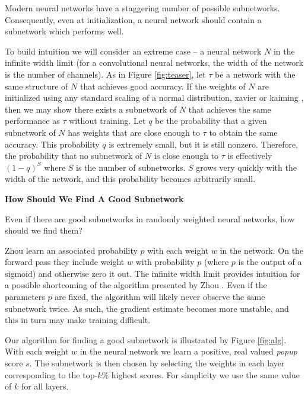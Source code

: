 \documentclass[10pt,twocolumn,letterpaper]{article}
\begin{document}
Modern neural networks have a staggering number of possible subnetworks. Consequently, even at initialization, a neural network should contain a subnetwork which performs well. 

To build intuition we will consider an extreme case -- a neural network $N$ in the infinite width limit (for a convolutional neural networks, the width of the network is the number of channels). As in Figure \ref{fig:teaser}, let $\tau$ be a network with the same structure of $N$ that achieves good accuracy. If the weights of $N$ are initialized using any standard scaling of a normal distribution, \eg xavier \cite{glorot} or kaiming \cite{kaiming-init}, then we may show there exists a subnetwork of $N$ that achieves the same performance as $\tau$ without training. Let $q$ be the probability that a given subnetwork of $N$ has weights that are close enough to $\tau$ to obtain the same accuracy. This probability $q$ is extremely small, but it is still nonzero. Therefore, the probability that no subnetwork of $N$ is close enough to $\tau$ is effectively $(1-q)^S$ where $S$ is the number of subnetworks. $S$ grows very quickly with the width of the network, and this probability becomes arbitrarily small.

\noindent \textbf{How Should We Find A Good Subnetwork}


Even if there are good subnetworks in randomly weighted neural networks, how should we find them? 


Zhou \etal learn an associated probability $p$ with each weight $w$ in the network. On the forward pass they include weight $w$ with probability $p$ (where $p$ is the output of a sigmoid) and otherwise zero it out. The infinite width limit provides intuition for a possible shortcoming of the algorithm presented by Zhou \etal \cite{supermask}. Even if the parameters $p$ are fixed, the algorithm will likely never observe the same subnetwork twice. As such, the gradient estimate becomes more unstable, and this in turn may make training difficult.

Our algorithm for finding a good subnetwork is illustrated by Figure \ref{fig:alg}. With each weight $w$ in the neural network we learn a positive, real valued \textit{popup} score $s$. The subnetwork is then chosen by selecting the weights in each layer corresponding to the top-$k\%$ highest scores. For simplicity we use the same value of $k$ for all layers. 
\end{document}
